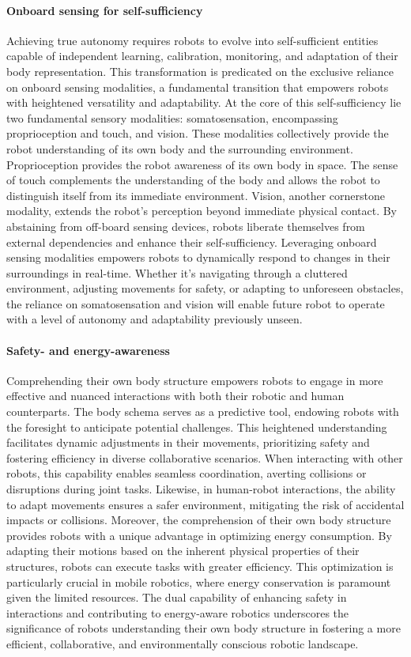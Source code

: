 \paragraph{Onboard sensing for self-sufficiency} Achieving true autonomy requires robots to evolve into self-sufficient entities capable of independent learning, calibration, monitoring, and adaptation of their body representation. This transformation is predicated on the exclusive reliance on onboard sensing modalities, a fundamental transition that empowers robots with heightened versatility and adaptability. At the core of this self-sufficiency lie two fundamental sensory modalities: somatosensation, encompassing proprioception and touch, and vision. These modalities collectively provide the robot understanding of its own body and the surrounding environment. Proprioception provides the robot awareness of its own body in space. The sense of touch complements the understanding of the body and allows the robot to distinguish itself from its immediate environment. Vision, another cornerstone modality, extends the robot's perception beyond immediate physical contact. By abstaining from off-board sensing devices, robots liberate themselves from external dependencies and enhance their self-sufficiency. Leveraging onboard sensing modalities empowers robots to dynamically respond to changes in their surroundings in real-time. Whether it's navigating through a cluttered environment, adjusting movements for safety, or adapting to unforeseen obstacles, the reliance on somatosensation and vision will enable future robot to operate with a level of autonomy and adaptability previously unseen.

\paragraph*{Safety- and energy-awareness} Comprehending their own body structure empowers robots to engage in more effective and nuanced interactions with both their robotic and human counterparts. The body schema serves as a predictive tool, endowing robots with the foresight to anticipate potential challenges. This heightened understanding facilitates dynamic adjustments in their movements, prioritizing safety and fostering efficiency in diverse collaborative scenarios. When interacting with other robots, this capability enables seamless coordination, averting collisions or disruptions during joint tasks. Likewise, in human-robot interactions, the ability to adapt movements ensures a safer environment, mitigating the risk of accidental impacts or collisions. Moreover, the comprehension of their own body structure provides robots with a unique advantage in optimizing energy consumption. By adapting their motions based on the inherent physical properties of their structures, robots can execute tasks with greater efficiency. This optimization is particularly crucial in mobile robotics, where energy conservation is paramount given the limited resources. The dual capability of enhancing safety in interactions and contributing to energy-aware robotics underscores the significance of robots understanding their own body structure in fostering a more efficient, collaborative, and environmentally conscious robotic landscape.


